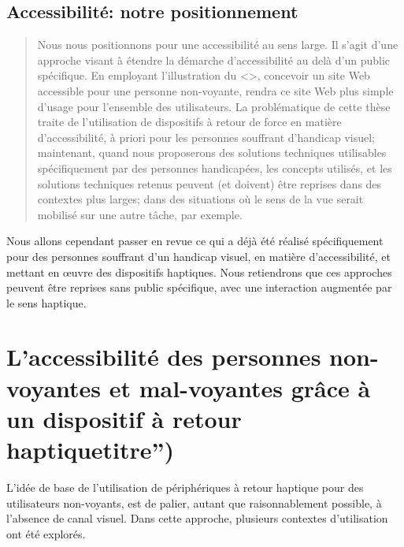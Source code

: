 \documentclass[
]{book}
\begin{document}
\hypertarget{accessibilituxe9-notre-positionnement}{%
\subsection{Accessibilité: notre positionnement}\label{accessibilituxe9-notre-positionnement}}

\begin{quote}
Nous nous positionnons pour une accessibilité au
sens large. Il s'agit d'une approche visant à étendre la démarche
d'accessibilité au delà d'un public spécifique. En employant
l'illustration du \textless{}\textgreater,
concevoir un site Web accessible pour une personne non-voyante, rendra ce
site Web plus simple d'usage pour l'ensemble des utilisateurs. La
problématique de cette thèse traite de l'utilisation de dispositifs à
retour de force en matière d'accessibilité, à priori pour les personnes
souffrant d'handicap visuel; maintenant, quand nous proposerons des
solutions techniques utilisables spécifiquement par des personnes
handicapées, les concepts utilisés, et les solutions techniques retenus
peuvent (et doivent) être reprises dans des contextes plus larges; dans
des situations où le sens de la vue serait mobilisé sur une autre tâche,
par exemple.
\end{quote}

Nous allons cependant passer en revue ce qui a déjà été réalisé
spécifiquement pour des personnes souffrant d'un handicap visuel, en matière
d'accessibilité, et mettant en œuvre des dispositifs haptiques. Nous
retiendrons que ces approches peuvent être reprises sans public spécifique,
avec une interaction augmentée par le sens haptique.

\hypertarget{laccessibilituxe9-des-personnes-non-voyantes-et-mal-voyantes-gruxe2ce-uxe0-un-dispositif-uxe0-retour-haptiquetitre}{%
\section{L'accessibilité des personnes non-voyantes et mal-voyantes grâce à un dispositif à retour haptiquetitre'')}\label{laccessibilituxe9-des-personnes-non-voyantes-et-mal-voyantes-gruxe2ce-uxe0-un-dispositif-uxe0-retour-haptiquetitre}}

L'idée de base de l'utilisation de périphériques à retour haptique pour
des utilisateurs non-voyants, est de palier, autant que raisonnablement
possible, à l'absence de canal visuel. Dans cette approche, plusieurs
contextes d'utilisation ont été explorés.
\end{document}
